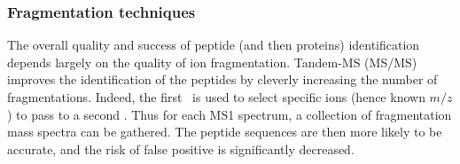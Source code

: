 \begin{comment}
Compared with other traps, linear ion traps provide an enhanced dynamic range
with a reduced low mass cut-off as the ion cloud is
spatially distributed on a linear axis and not a 3D centre which improves the
sensitivity. And then, for example, the ions may then be accumulated before
being released into another mass analyser~\mycite{Madalinski2008}.\mybr\

\minisec{\orbi}
It is a very recent analyser and it relies on \gls{FT}. Recently,
there is increasing use of \glspl{FTMS} for proteomic studies. Indeed, these
\glspl{FTMS} are more precise than previous analysers and allow the detection of
a greater range of ions in very short lapses of time~\mycite{Scigelova2011}.
In this kind of analyser, ions are trapped and both orbit around and oscillate
in an electrostatic field between an inner and outer part of a central electrode
shaped as a spindle.
The ions can only move following the spindle long axis~\mycite{Makarov2000}.
While moving around the spindle the ions create a current.
The outer part of the spindle records images of this current.
Fourier transformation of these images allows obtaining very highly accurate
and sensitive mass spectra for a greater dynamic range than most of the
other analysers.~\mycite{Hu2005}\mybr\

\minisec{\gls{LTQ}-\orbi}
It is a hybrid (tandem) mass spectrometer that uses \gls{ESI} for the ionisation
step and has an \gls{LTQ} as a first analyser (MS$^1$)
and an \orbi\ as a second one (MS$^2$).
This \gls{MS/MS} enables multiple levels of
fragmentation for the elucidation of a wide range of peptides and can be coupled
with an \gls{ESI} which is a continuous source of ionisation. This instrument
allows analysing proteomic samples optimally both in terms of starting material,
time~\mycite{Scigelova2011} and provides \enquote{ultrahigh} mass resolution,
high mass accuracy
and enhanced dynamic range with respect to mass accuracy~\mycite{Madalinski2008}.\mybr\
\end{comment}

\subsubsection{Fragmentation techniques~}

The overall quality and success of peptide (and then proteins)
identification depends largely on the quality of ion fragmentation.
Tandem-\gls{MS} (\gls{MS/MS}) improves the identification of the peptides
by cleverly increasing the number of fragmentations.
Indeed, the first \ms\ is
used to select specific ions (hence known $m/z$) to pass to a second \ms.
Thus for each MS1 spectrum, a collection of fragmentation mass spectra
can be gathered. The peptide sequences are then more likely to be accurate, and
the risk of false positive is significantly decreased.\mybr\


